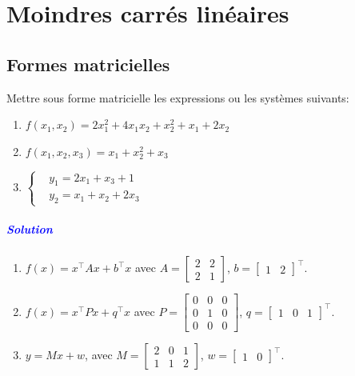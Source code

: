 \chapter{Moindres carrés linéaires}


\section{Formes matricielles}

Mettre sous forme matricielle les expressions ou les systèmes suivants:
	\begin{enumerate}
		\item $f(x_1,x_2) = 2 x_1^2 + 4x_1x_2 + x_2^2 + x_1 + 2x_2$
		\item $f(x_1,x_2,x_3) = x_1 + x_2^2 + x_3$
		\item $\left\{\begin{aligned} 
			&y_1 = 2x_1 + x_3 + 1 \\
			&y_2 = x_1 + x_2 + 2x_3
			\end{aligned} \right.$ 
	\end{enumerate}

\begin{hide}
\paragraph{\textcolor{blue}{Solution}}
\begin{enumerate}
	\item $f(x) = x^\top A x + b^\top x$ avec $A = \begin{bmatrix} 2 & 2 \\ 2 & 1\end{bmatrix}$, $b=\begin{bmatrix} 1 & 2 \end{bmatrix}^\top$.
	\item $f(x) = x^\top P x + q^\top x$ avec $P = \begin{bmatrix} 0 & 0 & 0 \\ 0 & 1 & 0 \\ 0 & 0 & 0 \end{bmatrix}$, $q=\begin{bmatrix} 1 & 0 & 1 \end{bmatrix}^\top$.
	\item $y = Mx + w$, avec $M = \begin{bmatrix} 2 & 0 & 1 \\ 1 & 1 & 2 \end{bmatrix}$, $w = \begin{bmatrix} 1 & 0 \end{bmatrix}^\top$.
\end{enumerate}
\end{hide}

